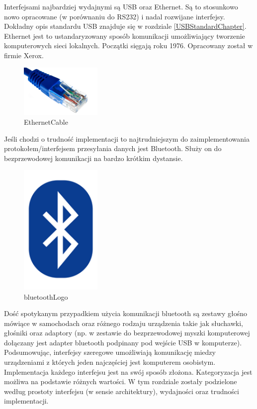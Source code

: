 \documentclass{BscUS}
\begin{document}
\indent Interfejsami najbardziej wydajnymi są USB oraz Ethernet. Są to stosunkowo nowo opracowane (w porównaniu do RS232) i nadal rozwijane interfejsy. Dokładny opis standardu USB znajduje się w rozdziale \ref{USBStandardChapter}. Ethernet jest to ustandaryzowany sposób komunikacji umożliwiający tworzenie komputerowych sieci lokalnych. Początki sięgają roku 1976. Opracowany został w firmie Xerox.
\begin{figure}[H]
\centering
\includegraphics[width=0.35\textwidth]{./img/ethernet-cable}
\caption{EthernetCable}
\label{fig:EthernetCable}
\end{figure}
Jeśli chodzi o trudność implementacji to najtrudniejszym do zaimplementowania protokołem/interfejsem przesyłania danych jest Bluetooth. Służy on do bezprzewodowej komunikacji na bardzo krótkim dystansie.
\begin{figure}[H]
\centering
\includegraphics[width=0.35\textwidth]{./img/bluetooth-logo}
\caption{bluetoothLogo}
\label{fig:blueTooth}
\end{figure}
Dość spotykanym przypadkiem użycia komunikacji bluetooth są zestawy głośno mówiące w samochodach oraz różnego rodzaju urządzenia takie jak słuchawki, głośniki oraz adaptory (np. w zestawie do bezprzewodowej myszki komputerowej dołączany jest adapter bluetooth podpinany pod wejście USB w komputerze).
\newline
\indent Podsumowując, interfejsy szeregowe umożliwiają komunikację miedzy urządzeniami z których jeden najczęściej jest komputerem osobistym. Implementacja każdego interfejsu jest na swój sposób złożona. Kategoryzacja jest możliwa na podstawie różnych wartości. W tym rozdziale zostały podzielone według prostoty interfejsu (w sensie architektury), wydajności oraz trudności implementacji.
\end{document}
